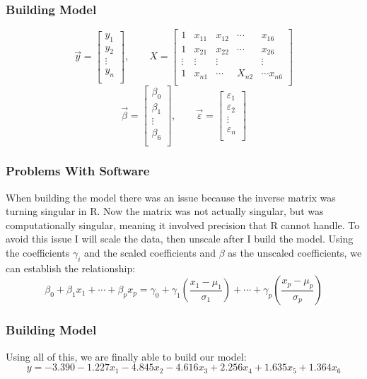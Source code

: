 \documentclass[12pt]{beamer}
\begin{document}
\begin{frame}
\frametitle{Building Model}
$$\vec{y}=\begin{bmatrix}
	y_1\\
	y_2\\
	\vdots\\
	y_n\\
\end{bmatrix},\qquad X=\begin{bmatrix}
	1 & x_{11} & x_{12} & \cdots & x_{16}\\
	1 & x_{21} & x_{22} & \cdots & x_{26}\\
	\vdots & \vdots & \vdots & & \vdots\\
	1 & x_{n1} & \cdots & X_{n2} & \cdots x_{n6}\\
\end{bmatrix}$$ \vspace{1cm} $$\vec{\beta}=\begin{bmatrix}
	\beta_0\\
	\beta_1\\
	\vdots\\
	\beta_6\\
\end{bmatrix},\qquad \vec{\varepsilon}=\begin{bmatrix}
	\varepsilon_1\\
	\varepsilon_2\\
	\vdots\\
	\varepsilon_n\\
\end{bmatrix}$$
\end{frame}

\begin{frame}
\frametitle{Problems With Software}
When building the model there was an issue because the inverse matrix was turning singular in R. Now the matrix was not actually singular, but was computationally singular, meaning it involved precision that R cannot handle. To avoid this issue I will scale the data, then unscale after I build the model. Using the coefficients $\gamma_i$ and the scaled coefficients and $\beta$ as the unscaled coefficients, we can establish the relationship: $$\beta_0+\beta_1x_1+\cdots+\beta_px_p=\gamma_0+\gamma_1\left(\frac{x_1-\mu_1}{\sigma_1}\right)+\cdots+\gamma_p\left(\frac{x_p-\mu_p}{\sigma_p}\right)$$
\end{frame}

\begin{frame}
\frametitle{Building Model}
Using all of this, we are finally able to build our model: {\footnotesize $$y=-3.390-1.227x_1-4.845x_2-4.616x_3+2.256x_4+1.635x_5+1.364x_6$$}
\end{frame}
\end{document}
